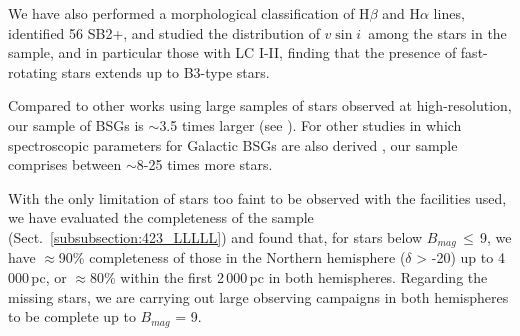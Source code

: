 \documentclass{aa}
\newcommand{\vsini}{\mbox{$v\sin i$}}
\begin{document}
We have also performed a morphological classification of H$\beta$ and H$\alpha$ lines, identified 56 SB2+, and studied the distribution of \vsini\ among the stars in the sample, and in particular those with LC I-II, finding that the presence of fast-rotating stars extends up to B3-type stars.

Compared to other works using large samples of stars observed at high-resolution, our sample of BSGs is $\sim$3.5 times larger (see \citet{2017A&A...597A..22S}). For other studies in which spectroscopic parameters for Galactic BSGs are also derived \citep[e.g.][]{2006A&A...446..279C,2008A&A...478..823M,2022A&A...668A..92W}, our sample comprises between $\sim$8-25 times more stars. 

With the only limitation of stars too faint to be observed with the facilities used, we have evaluated the completeness of the sample (Sect.~\ref{subsubsection:423_LLLLL}) and found that, for stars below $B_{mag}\,\leq$\,9, we have $\approx$90\% completeness of those in the Northern hemisphere ($\delta$ > -20) up to 4\,000\,pc, or $\approx$80\% within the first 2\,000\,pc in both hemispheres. Regarding the missing stars, we are carrying out large observing campaigns in both hemispheres to be complete up to $B_{mag}$ = 9. 
\end{document}
